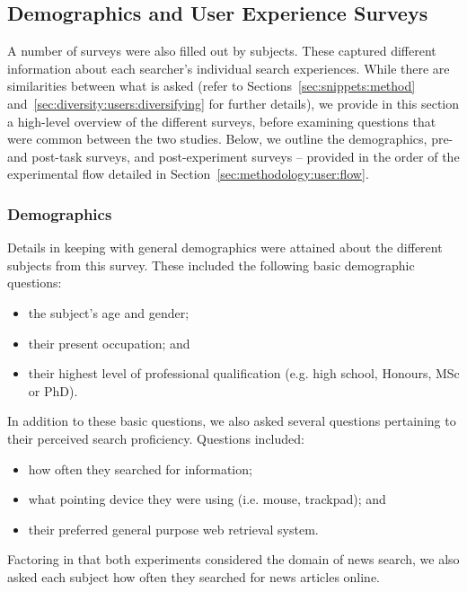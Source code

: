 \subsection{Demographics and User Experience Surveys}\label{sec:methodology:extracting:user}
A number of surveys were also filled out by subjects. These captured different information about each searcher's individual search experiences. While there are similarities between what is asked (refer to Sections~\ref{sec:snippets:method} and~\ref{sec:diversity:users:diversifying} for further details), we provide in this section a high-level overview of the different surveys, before examining questions that were common between the two studies. Below, we outline the demographics, pre- and post-task surveys, and post-experiment surveys -- provided in the order of the experimental flow detailed in Section~\ref{sec:methodology:user:flow}.

\subsubsection{Demographics}
Details in keeping with general demographics were attained about the different subjects from this survey. These included the following basic demographic questions:

\begin{itemize}
    \item{the subject's age and gender;}
    \item{their present occupation; and}
    \item{their highest level of professional qualification (e.g. high school, Honours, MSc or PhD).}
\end{itemize}

In addition to these basic questions, we also asked several questions pertaining to their perceived search proficiency. Questions included:

\begin{itemize}
    \item{how often they searched for information;}
    \item{what pointing device they were using (i.e. mouse, trackpad); and}
    \item{their preferred general purpose web retrieval system.}
\end{itemize}

Factoring in that both experiments considered the domain of news search, we also asked each subject how often they searched for news articles online.

